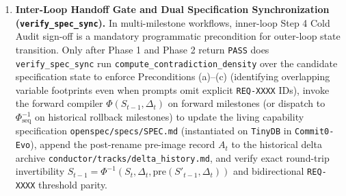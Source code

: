 \documentclass[11pt,a4paper,copyright]{google}
\begin{document}
\begin{enumerate}[leftmargin=1.5em,itemsep=3pt,topsep=3pt]
\texttt{\_\_import\_\_}, \texttt{open(..., "w"|"a")}, \texttt{os.chmod}, or fixture \texttt{.clear()}/\texttt{.pop()}) targeting \texttt{self.\_\_class\_\_}, \texttt{sys.modules}, \texttt{builtins}, or imported production module symbols. The resealed test suite is then re-executed under a bounded retry ceiling $K_{\max} = 3$; if any newly appended test fails against the current implementation, control returns to Step 3 under the updated read-only lock to repair the production code.
  \item \textbf{Inter-Loop Handoff Gate and Dual Specification Synchronization (\texttt{verify\_spec\_sync}).} In multi-milestone workflows, inner-loop Step 4 Cold Audit sign-off is a mandatory programmatic precondition for outer-loop state transition. Only after Phase 1 and Phase 2 return \texttt{PASS} does \texttt{verify\_spec\_sync} run \texttt{compute\_contradiction\_density} over the candidate specification state to enforce Preconditions (a)--(c) (identifying overlapping variable footprints even when prompts omit explicit \texttt{REQ-XXXX} IDs), invoke the forward compiler $\Phi(S_{t-1}, \Delta_t)$ on forward milestones (or dispatch to $\Phi_{\text{seq}}^{-1}$ on historical rollback milestones) to update the living capability specification \texttt{openspec/specs/\allowbreak SPEC.md} (instantiated on \texttt{TinyDB} in \texttt{Commit0-Evo}), append the post-rename pre-image record $A_t$ to the historical delta archive \texttt{conductor/tracks/\allowbreak delta\_history.md}, and verify exact round-trip invertibility $S_{t-1} = \Phi^{-1}(S_t, \Delta_t, \text{pre}(S'_{t-1}, \Delta_t))$ and bidirectional \texttt{REQ-XXXX} threshold parity.
\end{enumerate}
\end{document}
